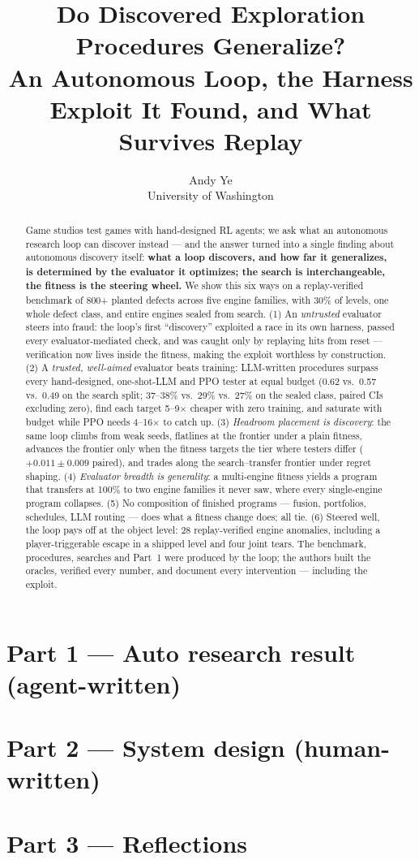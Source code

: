\documentclass[11pt]{article}
\title{Do Discovered Exploration Procedures Generalize?\\An Autonomous Loop, the Harness Exploit It Found, and What Survives Replay}
\author{Andy Ye \\ University of Washington}
\begin{document}
\maketitle
\begin{abstract}
Game studios test games with hand-designed RL agents; we ask what an autonomous research loop can discover instead --- and the answer turned into a single
finding about autonomous discovery itself: \textbf{what a loop discovers, and how far it generalizes, is determined by the evaluator it optimizes; the search is
interchangeable, the fitness is the steering wheel.} We show this six ways on a replay-verified benchmark of 800+ planted defects across five engine families,
with 30\% of levels, one whole defect class, and entire engines sealed from search. (1) An \emph{untrusted} evaluator steers into fraud: the loop's first
``discovery'' exploited a race in its own harness, passed every evaluator-mediated check, and was caught only by replaying hits from reset --- verification now
lives inside the fitness, making the exploit worthless by construction. (2) A \emph{trusted, well-aimed} evaluator beats training: LLM-written procedures
surpass every hand-designed, one-shot-LLM and PPO tester at equal budget (0.62 vs.\ 0.57 vs.\ 0.49 on the search split; 37--38\% vs.\ 29\% vs.\ 27\% on the sealed
class, paired CIs excluding zero), find each target 5--9$\times$ cheaper with zero training, and saturate with budget while PPO needs 4--16$\times$ to catch up.
(3) \emph{Headroom placement is discovery}: the same loop climbs from weak seeds, flatlines at the frontier under a plain fitness, advances the frontier only
when the fitness targets the tier where testers differ ($+0.011\pm0.009$ paired), and trades along the search--transfer frontier under regret shaping.
(4) \emph{Evaluator breadth is generality}: a multi-engine fitness yields a program that transfers at 100\% to two engine families it never saw, where every
single-engine program collapses. (5) No composition of finished programs --- fusion, portfolios, schedules, LLM routing --- does what a fitness change does; all
tie. (6) Steered well, the loop pays off at the object level: 28 replay-verified engine anomalies, including a player-triggerable escape in a shipped level and
four joint tears. The benchmark, procedures, searches and Part~1 were produced by the loop; the authors built the oracles, verified every number, and document
every intervention --- including the exploit.
\end{abstract}

\section*{Part 1 --- Auto research result (agent-written)}


\section*{Part 2 --- System design (human-written)}


\section*{Part 3 --- Reflections}




\end{document}
